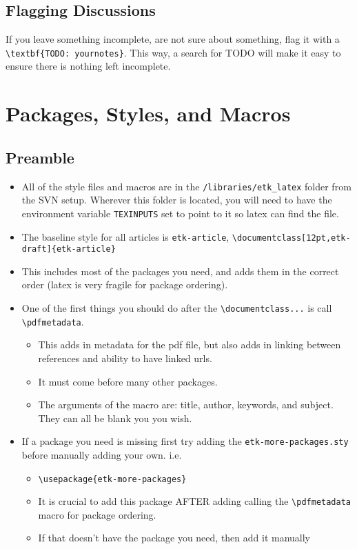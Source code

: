 \documentclass[12pt,etk-draft]{etk-article}
\begin{document}
\subsection{Flagging Discussions}
If you leave something incomplete, are not sure about something, flag it with a \verb!\textbf{TODO: yournotes}!.  This way, a search for TODO will make it easy to ensure there is nothing left incomplete.


\section{Packages, Styles, and Macros}
\subsection{Preamble}
\begin{itemize}
\item All of the style files and macros are in the \verb!/libraries/etk_latex! folder from the SVN setup.  Wherever this folder is located, you will need to have the environment variable \verb!TEXINPUTS! set to point to it so latex can find the file.
\item The baseline style for all articles is \verb!etk-article!, \verb!\documentclass[12pt,etk-draft]{etk-article}!
\item This includes most of the packages you need, and adds them in the correct order (latex is very fragile for package ordering).
\item One of the first things you should do after the \verb!\documentclass...! is call \verb!\pdfmetadata!.
\begin{itemize}
\item This adds in metadata for the pdf file, but also adds in linking between references and ability to have linked urls.
\item It must come before many other packages.
\item The arguments of the macro are: title, author, keywords, and subject.  They can all be blank you you wish.
\end{itemize}  
\item If a package you need is missing first try adding the \verb!etk-more-packages.sty! before manually adding your own.  i.e. 
\begin{itemize}
\item \verb!\usepackage{etk-more-packages}!
\item It is crucial to add this package AFTER adding calling the \verb!\pdfmetadata! macro for package ordering.
\item If that doesn't have the package you need, then add it manually
\end{itemize}
\end{itemize}
\end{document}
